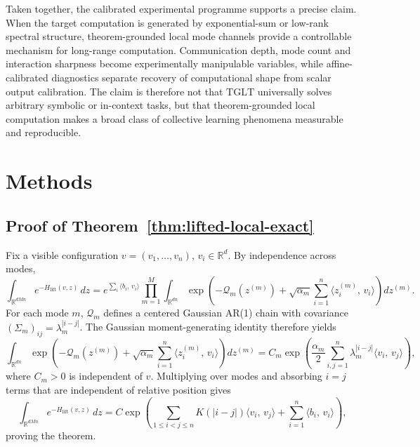 \documentclass[11pt]{article}
\theoremstyle{definition}
\newcommand{\R}{\mathbb{R}}
\newcommand{\TGLT}{\ensuremath{\mathrm{TGLT}}}
\newcommand{\ip}[2]{\langle #1,\, #2 \rangle}
\begin{document}
Taken together, the calibrated experimental programme supports a precise claim. When the target computation is generated by exponential-sum or low-rank spectral structure, theorem-grounded local mode channels provide a controllable mechanism for long-range computation. Communication depth, mode count and interaction sharpness become experimentally manipulable variables, while affine-calibrated diagnostics separate recovery of computational shape from scalar output calibration. The claim is therefore not that \TGLT{} universally solves arbitrary symbolic or in-context tasks, but that theorem-grounded local computation makes a broad class of collective learning phenomena measurable and reproducible.

\section*{Methods}

\subsection*{Proof of Theorem~\ref{thm:lifted-local-exact}}

Fix a visible configuration \(v=(v_1,\dots,v_n)\), \(v_i\in\R^d\). By independence across modes,
\begin{equation}
\int_{\R^{dMn}} e^{-H_{\mathrm{lift}}(v,z)}\,dz
=
e^{\sum_i \ip{b_i}{v_i}}
\prod_{m=1}^{M}
\int_{\R^{dn}}
\exp\!\left(
-\mathcal Q_m(z^{(m)})
+
\sqrt{\alpha_m}\sum_{i=1}^{n}\ip{z_i^{(m)}}{v_i}
\right)dz^{(m)}.
\label{eq:factored-integral}
\end{equation}
For each mode \(m\), \(\mathcal Q_m\) defines a centered Gaussian AR(1) chain with covariance \((\Sigma_m)_{ij}=\lambda_m^{|i-j|}\). The Gaussian moment-generating identity therefore yields
\begin{equation}
\int_{\R^{dn}}
\exp\!\left(
-\mathcal Q_m(z^{(m)})
+
\sqrt{\alpha_m}\sum_{i=1}^{n}\ip{z_i^{(m)}}{v_i}
\right)dz^{(m)}
=
C_m \exp\!\left(
\frac{\alpha_m}{2}\sum_{i,j=1}^{n}\lambda_m^{|i-j|}\ip{v_i}{v_j}
\right),
\label{eq:single-mode-mgf}
\end{equation}
where \(C_m>0\) is independent of \(v\). Multiplying over modes and absorbing \(i=j\) terms that are independent of relative position gives
\begin{equation}
\int_{\R^{dMn}} e^{-H_{\mathrm{lift}}(v,z)}\,dz
=
C\exp\!\left(
\sum_{1\le i<j\le n} K(|i-j|)\ip{v_i}{v_j}
+
\sum_{i=1}^{n}\ip{b_i}{v_i}
\right),
\end{equation}
proving the theorem.
\end{document}
